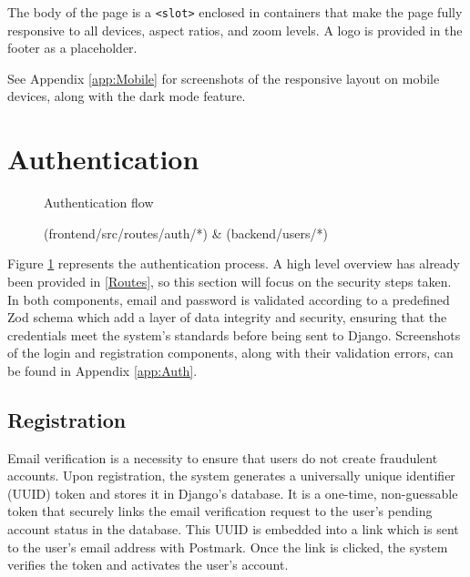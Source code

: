 The body of the page is a \texttt{<slot>} enclosed in containers that make the page fully responsive to all devices, aspect ratios, and zoom levels. A logo is provided in the footer as a placeholder.

See Appendix \ref{app:Mobile} for screenshots of the responsive layout on mobile devices, along with the dark mode feature.

\section{Authentication}
\begin{figure}[h]
\centering
{}
\vspace{-20pt}
\caption{Authentication flow}
\vspace{-10pt}
\caption*{(frontend/src/routes/auth/*) \& (backend/users/*)}
\label{fig:auth}
\vspace{-5pt}
\end{figure}

Figure \ref{fig:auth} represents the authentication process. A high level overview has already been provided in \ref{Routes}, so this section will focus on the security steps taken. In both components, email and password is validated according to a predefined Zod schema which add a layer of data integrity and security, ensuring that the credentials meet the system's standards before being sent to Django. Screenshots of the login and registration components, along with their validation errors, can be found in Appendix \ref{app:Auth}.
\subsection{Registration}
Email verification is a necessity to ensure that users do not create fraudulent accounts. Upon registration, the system generates a universally unique identifier (UUID) token and stores it in Django's database.  It is a one-time, non-guessable token that securely links the email verification request to the user's pending account status in the database. This UUID is embedded into a link which is sent to the user's email address with Postmark. Once the link is clicked, the system verifies the token and activates the user's account.

